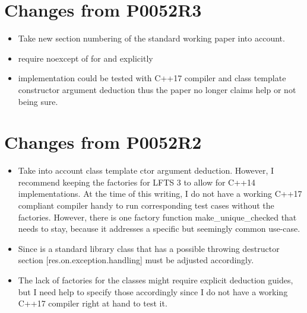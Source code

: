 \documentclass[ebook,11pt,article]{memoir}
\begin{document}
\section{Changes from P0052R3}
\begin{itemize}
\item Take new section numbering of the standard working paper into account.
\item require noexcept of  for  and  explicitly
\item implementation could be tested with C++17 compiler and class template constructor argument deduction thus the paper no longer claims help or not being sure.
\end{itemize}


\section{Changes from P0052R2}
\begin{itemize}
\item Take into account class template ctor argument deduction. However, I recommend keeping the factories for LFTS 3 to allow for C++14 implementations. At the time of this writing, I do not have a working C++17 compliant compiler handy to run corresponding test cases without the factories. However, there is one factory function make_unique_checked that needs to stay, because it addresses a specific but seemingly common use-case.
\item Since  is a standard library class that has a possible throwing destructor section [res.on.exception.handling] must be adjusted accordingly.
\item The lack of factories for the classes might require explicit deduction guides, but I need help to specify those accordingly since I do not have a working C++17 compiler right at hand to test it.
\end{itemize}
\end{document}
